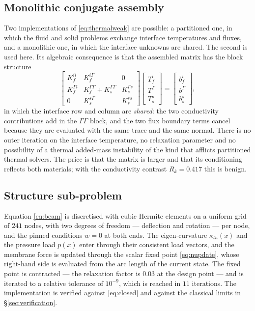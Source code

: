 \documentclass[11pt,a4paper]{article}
\newcommand{\Ga}{\Gamma}
\begin{document}
\subsection{Monolithic conjugate assembly}
\label{sec:monolithic}

Two implementations of \eqref{eq:thermalweak} are possible: a partitioned one,
in which the fluid and solid problems exchange interface temperatures and
fluxes, and a monolithic one, in which the interface unknowns are shared. The
second is used here. Its algebraic consequence is that the assembled matrix
has the block structure
\begin{equation}
\begin{bmatrix}
K_f^{ii} & K_f^{i\Ga} & 0\\
K_f^{\Ga i} & K_f^{\Ga\Ga}+K_s^{\Ga\Ga} & K_s^{\Ga s}\\
0 & K_s^{s\Ga} & K_s^{ss}
\end{bmatrix}
\begin{bmatrix}
T_f^{i}\\ T^{\Ga}\\ T_s^{s}
\end{bmatrix}
=
\begin{bmatrix}
b_f^{i}\\ b^{\Ga}\\ b_s^{s}
\end{bmatrix},
\label{eq:monolithic}
\end{equation}
in which the interface row and column are \emph{shared}: the two conductivity
contributions add in the $\Ga\Ga$ block, and the two flux boundary terms
cancel because they are evaluated with the same trace and the same normal.
There is no outer iteration on the interface temperature, no relaxation
parameter and no possibility of a thermal added-mass instability of the kind
that afflicts partitioned thermal solvers. The price is that the matrix is
larger and that its conditioning reflects both materials; with the
conductivity contrast $R_k=0.417$ this is benign.

\subsection{Structure sub-problem}
\label{sec:wallsolver}

Equation \eqref{eq:beam} is discretised with cubic Hermite elements on a
uniform grid of $241$ nodes, with two degrees of freedom --- deflection and
rotation --- per node, and the pinned conditions $w=0$ at both ends. The
eigen-curvature $\kappa_{th}(x)$ and the pressure load $p(x)$ enter through
their consistent load vectors, and the membrane force is updated through the
scalar fixed point \eqref{eq:nupdate}, whose right-hand side is evaluated from
the arc length of the current state. The fixed point is contracted --- the
relaxation factor is $0.03$ at the design point --- and is iterated to a
relative tolerance of $10^{-9}$, which is reached in $11$ iterations. The
implementation is verified against \eqref{eq:closed} and against the classical
limits in \S\ref{sec:verification}.
\end{document}
